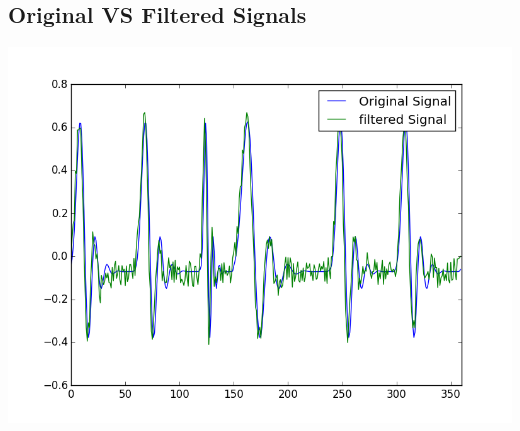 \documentclass{article}
\begin{document}
\subsection{Original VS Filtered Signals}

\includegraphics[scale=0.8]{original_vs_filtered.png}
\end{document}
